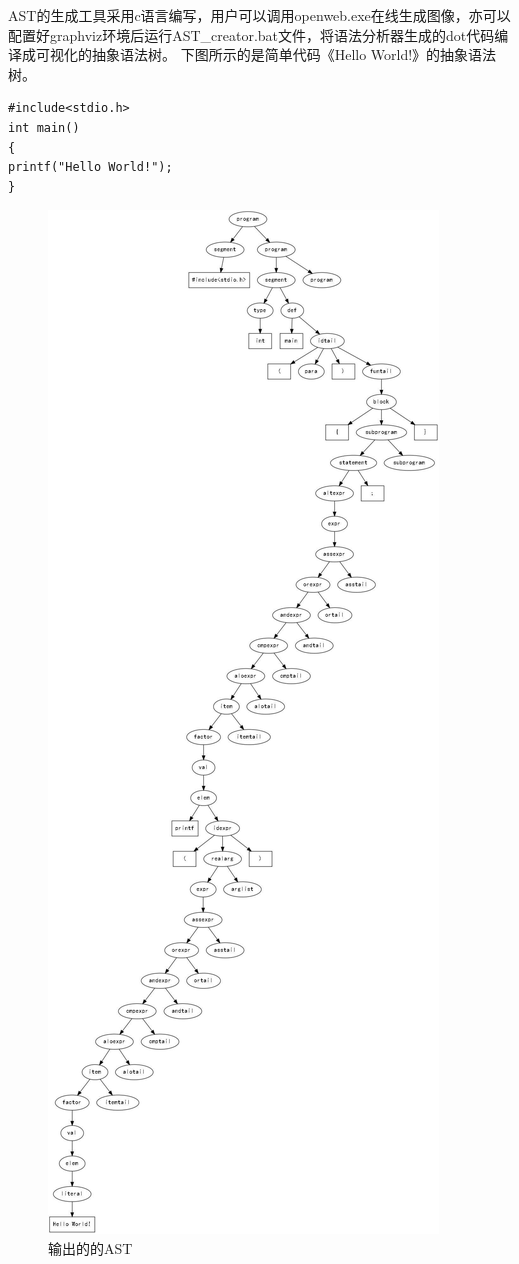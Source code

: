 \documentclass[supercite]{Experimental_Report}
\theoremstyle{definition}
\begin{document}
AST的生成工具采用c语言编写，用户可以调用openweb.exe在线生成图像，亦可以配置好graphviz环境后运行AST\_creator.bat文件，将语法分析器生成的dot代码编译成可视化的抽象语法树。
下图所示的是简单代码《Hello World!》的抽象语法树。
\begin{lstlisting}[title =输入的代码,frame=none]
#include<stdio.h>
int main()
{
printf("Hello World!");
}
\end{lstlisting}
\newpage
\begin{figure}[htb]
	\begin{center}
		\includegraphics[scale=0.15]{images/HelloWorld.pdf}
		\caption{输出的的AST}
		\label{fig1-2}
	\end{center}
\end{figure}
\end{document}

